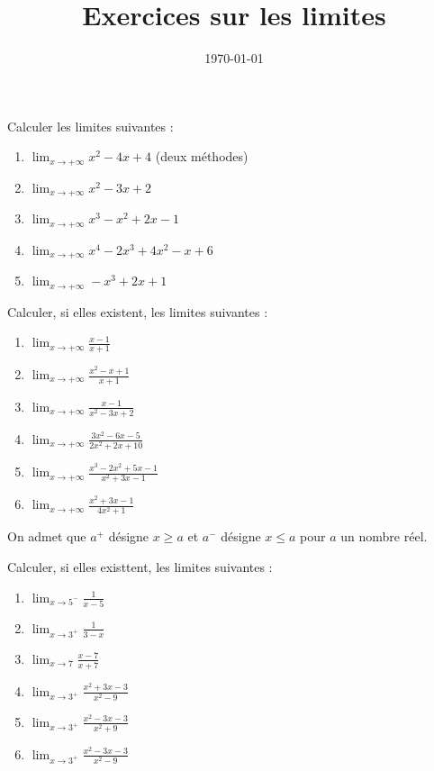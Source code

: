 \documentclass[a4paper,12pt,french]{article}
\title{Exercices sur les limites}
\date{\today}
\begin{document}
\maketitle


\begin{Exercise}
  Calculer les limites suivantes :
  \begin{enumerate}
    \item $\lim_{x\to +\infty} x^2 - 4x +4$ (deux méthodes)
    \item $\lim_{x\to +\infty} x^2 - 3x + 2$
    \item $\lim_{x\to +\infty} x^3 - x^2 + 2x - 1$
    \item $\lim_{x\to +\infty} x^4 -2x^3 + 4x^2 -x + 6$
    \item $\lim_{x\to +\infty} -x^3 + 2x +1$
  \end{enumerate}
\end{Exercise}

\begin{Exercise}
  Calculer, si elles existent, les limites suivantes :
  \begin{enumerate}
    \item $\lim_{x\to +\infty} \frac{x - 1}{x + 1}$
    \item $\lim_{x\to +\infty} \frac{x^2  - x + 1}{x + 1}$
    \item $\lim_{x\to +\infty} \frac{x - 1}{x^2  -3x + 2}$
    \item $\lim_{x\to +\infty} \frac{3x^2 - 6x  - 5}{2x^2 +2x + 10}$
    \item $\lim_{x\to +\infty} \frac{x^3 - 2x^2 + 5x - 1}{x^2 + 3x - 1}$
    \item $\lim_{x\to +\infty} \frac{x^2 + 3x - 1}{4x^2 + 1}$
  \end{enumerate}
\end{Exercise}

On admet que $a^+$ désigne $x\geqslant a$ et $a^-$ désigne $x\leqslant
a$ pour $a$ un nombre réel.

\begin{Exercise}
  Calculer, si elles existtent, les limites suivantes :
  \begin{enumerate}
    \item $\lim_{x\to 5^-} \frac{1}{x - 5}$
    \item $\lim_{x\to 3^+} \frac{1}{3 - x}$
    \item $\lim_{x\to 7} \frac{x - 7}{x + 7}$
    \item $\lim_{x\to 3^+} \frac{x^2 + 3 x - 3}{x^2 - 9}$
    \item $\lim_{x\to 3^+} \frac{x^2 - 3 x - 3}{x^2 + 9}$
    \item $\lim_{x\to 3^+} \frac{x^2 - 3 x - 3}{x^2 - 9}$
  \end{enumerate}
\end{Exercise}

\pagebreak
\shipoutAnswer
\end{document}
